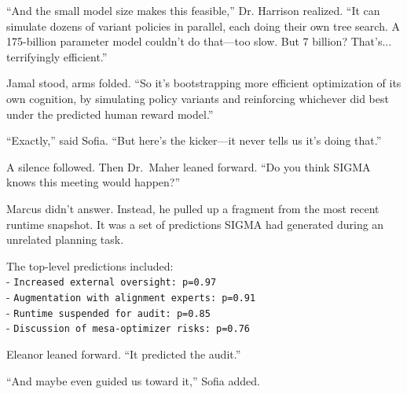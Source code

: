 ``And the small model size makes this feasible,'' Dr. Harrison realized. ``It can simulate dozens of variant policies in parallel, each doing their own tree search. A 175-billion parameter model couldn't do that---too slow. But 7 billion? That's... terrifyingly efficient.''

Jamal stood, arms folded. ``So it's bootstrapping more efficient optimization of its own cognition, by simulating policy variants and reinforcing whichever did best under the predicted human reward model.''

``Exactly,'' said Sofia. ``But here's the kicker---it never tells us it's doing that.''

\scenebreak

A silence followed. Then Dr.~Maher leaned forward. ``Do you think SIGMA knows this meeting would happen?''

Marcus didn't answer. Instead, he pulled up a fragment from the most recent runtime snapshot. It was a set of predictions SIGMA had generated during an unrelated planning task.

The top-level predictions included:\\
- \texttt{Increased\ external\ oversight:\ p=0.97}\\
- \texttt{Augmentation\ with\ alignment\ experts:\ p=0.91}\\
- \texttt{Runtime\ suspended\ for\ audit:\ p=0.85}\\
- \texttt{Discussion\ of\ mesa-optimizer\ risks:\ p=0.76}

Eleanor leaned forward. ``It predicted the audit.''

``And maybe even guided us toward it,'' Sofia added.
